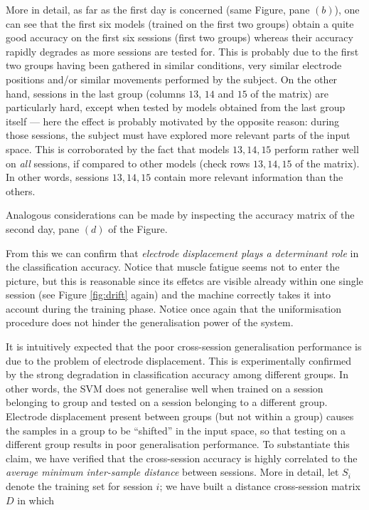 More in detail, as far as the first day is concerned (same Figure,
pane $(b)$), one can see that the first six models (trained on the
first two groups) obtain a quite good accuracy on the first six
sessions (first two groups) whereas their accuracy rapidly degrades as
more sessions are tested for. This is probably due to the first two
groups having been gathered in similar conditions, very similar
electrode positions and/or similar movements performed by the
subject. On the other hand, sessions in the last group (columns $13$,
$14$ and $15$ of the matrix) are particularly hard, except when tested
by models obtained from the last group itself --- here the effect is
probably motivated by the opposite reason: during those sessions, the
subject must have explored more relevant parts of the input
space. This is corroborated by the fact that models $13,14,15$ perform
rather well on \emph{all} sessions, if compared to other models (check
rows $13,14,15$ of the matrix). In other words, sessions $13,14,15$
contain more relevant information than the others.

Analogous considerations can be made by inspecting the accuracy matrix
of the second day, pane $(d)$ of the Figure.

From this we can confirm that \emph{electrode displacement plays a
determinant role} in the classification accuracy. Notice that muscle
fatigue seems not to enter the picture, but this is reasonable since
its effetcs are visible already within one single session (see Figure
\ref{fig:drift} again) and the machine correctly takes it into account
during the training phase. Notice once again that the uniformisation
procedure does not hinder the generalisation power of the system.

It is intuitively expected that the poor cross-session generalisation
performance is due to the problem of electrode displacement. This is
experimentally confirmed by the strong degradation in classification
accuracy among different groups. In other words, the SVM does not
generalise well when trained on a session belonging to group and
tested on a session belonging to a different group. Electrode
displacement present between groups (but not within a group) causes
the samples in a group to be ``shifted'' in the input space, so that
testing on a different group results in poor generalisation
performance. To substantiate this claim, we have verified that the
cross-session accuracy is highly correlated to the
\emph{average minimum inter-sample distance} between sessions. More in
detail, let $S_i$ denote the training set for session $i$; we have
built a distance cross-session matrix $D$ in which

